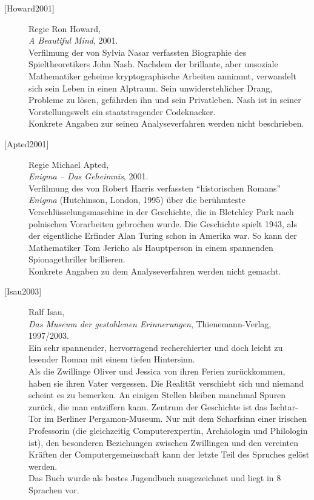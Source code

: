 \begin{refsegment}
\begin{description}
\item[\textrm{[Howard2001]}] 
    Regie Ron Howard, \\
    {\em A Beautiful Mind}, 2001. \\
    Verfilmung der von Sylvia Nasar verfassten Biographie des
    Spieltheoretikers John Nash.
    Nachdem der brillante, aber unsoziale Mathematiker geheime kryptographische
    Arbeiten annimmt, verwandelt sich sein Leben in einen Alptraum. Sein
    unwiderstehlicher Drang, Probleme zu lösen, gefährden ihn und sein
    Privatleben.
    Nash ist in seiner Vorstellungswelt ein staatstragender Codeknacker. \\
    Konkrete Angaben zur seinen Analyseverfahren werden nicht beschrieben.\\


\item[\textrm{[Apted2001]}] 
    Regie Michael Apted, \\
    {\em Enigma -- Das Geheimnis}, 2001. \\
    Verfilmung des von Robert Harris verfassten "`historischen Romans"'
    {\em Enigma} (Hutchinson, London, 1995) über die berühmteste
    Verschlüsselungsmaschine in der Geschichte, die in
    Bletchley Park nach polnischen Vorarbeiten gebrochen wurde.
    Die Geschichte spielt 1943, als der eigentliche Erfinder Alan Turing
    schon in Amerika war. So kann der Mathematiker Tom Jericho als Hauptperson
    in einem spannenden Spionagethriller brillieren.\\
    Konkrete Angaben zu dem Analyseverfahren werden nicht gemacht.\\


\item[\textrm{[Isau2003]}] 
    Ralf Isau, \\
    {\em Das Museum der gestohlenen Erinnerungen}, Thienemann-Verlag, 1997/2003. \\
    Ein sehr spannender, hervorragend recherchierter und doch leicht zu lesender
    Roman mit einem tiefen Hintersinn.\\
    Als die Zwillinge Oliver und Jessica von ihren Ferien zurückkommen, haben sie
    ihren Vater vergessen. Die Realität verschiebt sich und niemand scheint es zu
    bemerken. An einigen Stellen bleiben manchmal Spuren zurück, die man
    entziffern kann.
    Zentrum der Geschichte ist das Ischtar-Tor im Berliner Pergamon-Museum.
    Nur mit dem Scharfsinn einer irischen Professorin (die gleichzeitig
    Computerexpertin, Archäologin und Philologin ist), den besonderen
    Beziehungen zwischen Zwillingen und den vereinten Kräften der
    Computergemeinschaft kann der letzte Teil des Spruches gelöst werden.\\
    Das Buch wurde als bestes Jugendbuch ausgezeichnet und liegt in 8 Sprachen vor.\\



\end{description}
\end{refsegment}
